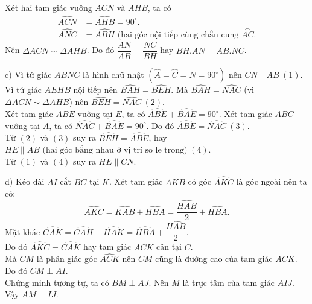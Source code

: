 \begin{bt}
{			Xét hai tam giác vuông $ACN$ và $AHB$, ta có
			\begin{align*}
				\widehat{ACN}&=\widehat{AHB}=90^\circ.\\
				\widehat{ANC}&=\widehat{ABH} \text{ (hai góc nội tiếp cùng chắn cung $\stackrel\frown{AC}$.}
			\end{align*}
			Nên $\Delta ACN \sim \Delta AHB$. Do đó $\dfrac{AN}{AB}=\dfrac{NC}{BH}$ hay $BH.AN=AB.NC$.
			\par c) Vì tứ giác $ABNC$ là hình chữ nhật $(\widehat{A}=\widehat{C}=\widehat{N}=90^\circ)$ nên $CN \parallel AB \hspace{3pt} (1)$.\\
			Vì tứ giác $AEHB$ nội tiếp nên $\widehat{BAH}=\widehat{BEH}$. Mà $\widehat{BAH}=\widehat{NAC}$ (vì $\Delta ACN \sim \Delta AHB$) nên $\widehat{BEH}=\widehat{NAC} \hspace{3pt} (2)$.\\
			Xét tam giác $ABE$ vuông tại $E$, ta có $\widehat{ABE}+\widehat{BAE}=90^\circ$.
			Xét tam giác $ABC$ vuông tại $A$, ta có $\widehat{NAC}+\widehat{BAE}=90^\circ$.
			Do đó $\widehat{ABE}=\widehat{NAC} \hspace{3pt} (3)$.\\
			Từ $(2)$ và $(3)$ suy ra $\widehat{BEH}=\widehat{ABE}$, hay $HE \parallel AB \text{ (hai góc bằng nhau ở vị trí so le trong)}\hspace{3pt} (4)$.\\
			Từ $(1)$ và $(4)$ suy ra $HE \parallel CN$.
			\par d) Kéo dài $AI$ cắt $BC$ tại $K$. Xét tam giác $AKB$ có góc $\widehat{AKC}$ là góc ngoài nên ta có:
			$$\widehat{AKC}=\widehat{KAB}+\widehat{HBA}=\dfrac{\widehat{HAB}}{2}+\widehat{HBA}.$$
			Mặt khác $\widehat{CAK}=\widehat{CAH}+\widehat{HAK}=\widehat{HBA}+\dfrac{\widehat{HAB}}{2}$.\\
			Do đó $\widehat{AKC}=\widehat{CAK}$ hay tam giác $ACK$ cân tại $C$.\\
			Mà $CM$ là phân giác góc $\widehat{ACK}$ nên $CM$ cũng là đường cao của tam giác $ACK$. Do đó $CM \perp AI$.\\
			Chứng minh tương tự, ta có $BM \perp AJ$. Nên $M$ là trực tâm của tam giác $AIJ$. Vậy $AM \perp IJ$.}
\end{bt}


